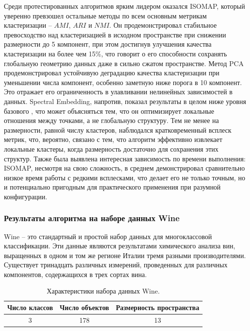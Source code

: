             Среди протестированных алгоритмов ярким лидером оказался ISOMAP, который уверенно превзошел остальные методы по всем основным метрикам кластеризации -- \(AMI\), \(ARI\) и \(NMI\). Он продемонстрировал стабильное превосходство над кластеризацией в исходном пространстве при снижении размерности до 5 компонент, при этом достигнув улучшения качества кластеризации на более чем 15\%, что говорит о его способности сохранять глобальную геометрию данных даже в сильно сжатом пространстве. Метод PCA продемонстрировал устойчивую деградацию качества кластеризации при уменьшении числа компонент, особенно заметную ниже порога в 10 компонент. Это отражает его ограниченность в улавливании нелинейных зависимостей в данных. Spectral Embedding, напротив, показал результаты в целом ниже уровня базового \kmeans{}, что может объясняться тем, что он оптимизирует локальные отношения между точками, а не глобальную структуру. Тем не менее на размерности, равной числу кластеров, наблюдался кратковременный всплеск метрик, что, вероятно, связано с тем, что алгоритм эффективно извлекает локальные кластеры, когда размерность достаточно для сохранения этих структур. Также была выявлена интересная зависимость по времени выполнения: ISOMAP, несмотря на свою сложность, в среднем демонстрировал сравнительно низкое время работы с редкими всплесками, что делает его не только точным, но и потенциально пригодным для практического применения при разумной конфигурации.

        \subsubsection{Результаты алгоритма на наборе данных Wine}
            Wine -- это стандартный и простой набор данных для многоклассовой классификации. Эти данные являются результатами химического анализа вин, выращенных в одном и том же регионе Италии тремя разными производителями. Существует тринадцать различных измерений, проведенных для различных компонентов, содержащихся в трех сортах вина.

            \begin{table}[H]
                \centering
                \caption{Характеристики набора данных Wine.}
                \begin{tabular}{ccc}
                    \toprule
                    Число классов &   Число объектов &   Размерность пространства \\
                    \midrule
                    3    &  178 &  13 \\
                    \bottomrule
                \end{tabular}
            \end{table}


